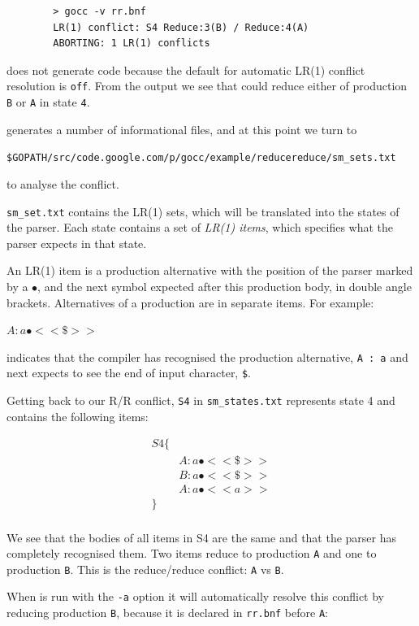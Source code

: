 \documentclass[12pt]{article}
\begin{document}
	\begin{verbatim}
		> gocc -v rr.bnf
		LR(1) conflict: S4 Reduce:3(B) / Reduce:4(A)
		ABORTING: 1 LR(1) conflicts
	\end{verbatim}

	\gocc does not generate code because the default for automatic LR(1) conflict resolution is \verb|off|. From the output we see that \gocc could reduce either of production \verb|B| or \verb|A| in state \verb|4|.

	\gocc generates a number of informational files, and at this point we turn to 

	\verb|$GOPATH/src/code.google.com/p/gocc/example/reducereduce/sm_sets.txt|

	to analyse the conflict.

	\verb|sm_set.txt| contains the LR(1) sets, which will be translated into the states of the parser. Each state contains a set of {\em LR(1)  items}, which specifies what the parser expects in that state. 

	An LR(1) item is a production alternative with the position of the parser marked by a $\bullet$, and the next symbol expected after this production body, in double angle brackets. Alternatives of a production are in  separate items. For example: 

	$A : a\bullet <<\$>>$

	indicates that the compiler has recognised the production alternative, \verb|A : a| and  next expects to see the end of input character, \verb|$|.

	Getting back to our R/R conflict, \verb|S4|  in \verb|sm_states.txt| represents state 4 and contains the following items:

	\[
		\begin{array}{ll}
			S4 \{ \\
			    & A : a\bullet  <<\$>> \\
			    & B : a\bullet  <<\$>> \\
			    & A : a\bullet  <<a>> \\
			\} \\
		\end{array}
	\]

	We see that the bodies of all items in S4 are the same and that the parser has completely recognised them. Two items reduce to production \verb|A| and one to production \verb|B|. This is the reduce/reduce conflict: \verb|A| vs \verb|B|.

	When \gocc is run with the \verb|-a| option it will automatically resolve this conflict by reducing production \verb|B|, because it is declared in \verb|rr.bnf| before \verb|A|:
\end{document}
